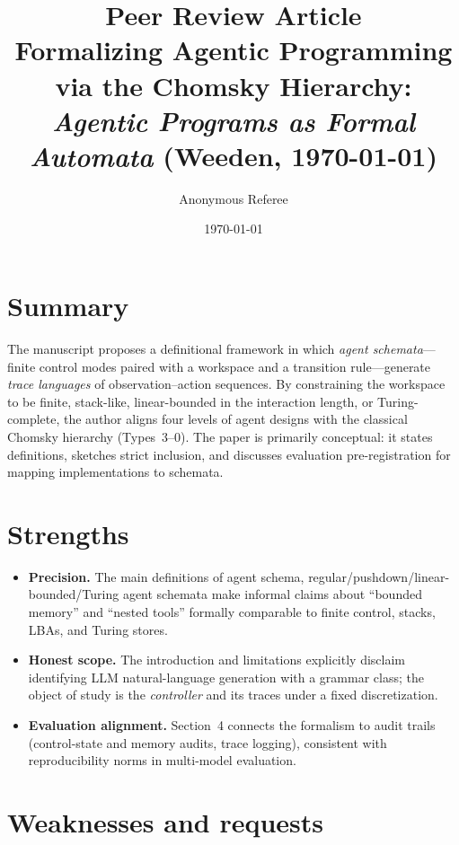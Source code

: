 \documentclass[12pt]{article}
\title{Peer Review Article\\\large Formalizing Agentic Programming via the Chomsky Hierarchy:\\\textit{Agentic Programs as Formal Automata} (Weeden, \today)}
\author{Anonymous Referee}
\date{\today}
\begin{document}
\maketitle

\section*{Summary}

The manuscript proposes a definitional framework in which \emph{agent schemata}---finite control modes paired with a workspace and a transition rule---generate \emph{trace languages} of observation--action sequences. By constraining the workspace to be finite, stack-like, linear-bounded in the interaction length, or Turing-complete, the author aligns four levels of agent designs with the classical Chomsky hierarchy (Types~3--0). The paper is primarily conceptual: it states definitions, sketches strict inclusion, and discusses evaluation pre-registration for mapping implementations to schemata.

\section*{Strengths}

\begin{itemize}
  \item \textbf{Precision.} The main definitions of agent schema, regular/pushdown/linear-bounded/Turing agent schemata make informal claims about ``bounded memory'' and ``nested tools'' formally comparable to finite control, stacks, LBAs, and Turing stores.
  \item \textbf{Honest scope.} The introduction and limitations explicitly disclaim identifying LLM natural-language generation with a grammar class; the object of study is the \emph{controller} and its traces under a fixed discretization.
  \item \textbf{Evaluation alignment.} Section~4 connects the formalism to audit trails (control-state and memory audits, trace logging), consistent with reproducibility norms in multi-model evaluation.
\end{itemize}

\section*{Weaknesses and requests}
\end{document}
